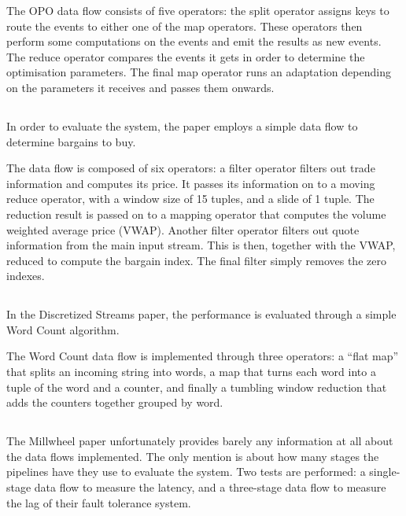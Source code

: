 The OPO data flow consists of five operators: the split operator assigns keys to route the events to either one of the map operators. These operators then perform some computations on the events and emit the results as new events. The reduce operator compares the events it gets in order to determine the optimisation parameters. The final map operator runs an adaptation depending on the parameters it receives and passes them onwards.

\subsection{}
In order to evaluate the system, the paper\cite{spade} employs a simple data flow to determine bargains to buy. \\


The data flow is composed of six operators: a filter operator filters out trade information and computes its price. It passes its information on to a moving reduce operator, with a window size of 15 tuples, and a slide of 1 tuple. The reduction result is passed on to a mapping operator that computes the volume weighted average price (VWAP). Another filter operator filters out quote information from the main input stream. This is then, together with the VWAP, reduced to compute the bargain index. The final filter simply removes the zero indexes.

\subsection{}
In the Discretized Streams paper\cite{discretized}, the performance is evaluated through a simple Word Count algorithm. \\


The Word Count data flow is implemented through three operators: a ``flat map'' that splits an incoming string into words, a map that turns each word into a tuple of the word and a counter, and finally a tumbling window reduction that adds the counters together grouped by word.

\subsection{}
The Millwheel paper\cite{millwheel} unfortunately provides barely any information at all about the data flows implemented. The only mention is about how many stages the pipelines have they use to evaluate the system. Two tests are performed: a single-stage data flow to measure the latency, and a three-stage data flow to measure the lag of their fault tolerance system.

